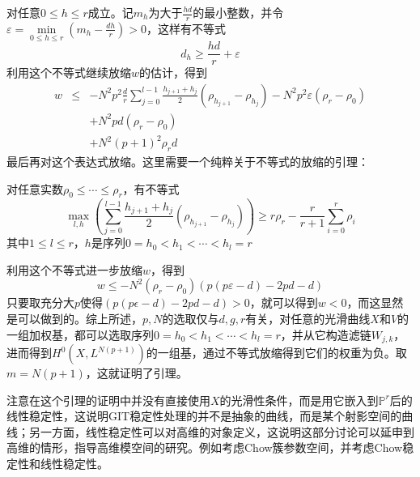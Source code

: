 对任意$ 0\leqslant h \leqslant r $成立。记$ m_h $为大于$ \frac{hd}{r} $的最小整数，并令$ \varepsilon=\underset{0\leqslant h \leqslant r}{\min}(m_h-\frac{dh}{r})>0 $，这样有不等式
$$ d_h\geqslant \dfrac{hd}{r}+\varepsilon $$
利用这个不等式继续放缩$ w $的估计，得到
\begin{equation*}
\begin{array}{rcl}
w&\leqslant&-N^2p^2\frac{d}{r}\sum_{j=0}^{l-1}\frac{    {h_{j+1}+ {h_j} }  }{2}(\rho_{h_{j+1}}-\rho_{h_j})-N^2p^2\varepsilon(\rho_r-\rho_0)\\
&&+N^2pd(\rho_r-\rho_0)\\
&&+N^2(p+1)^2\rho_rd
\end{array}
\end{equation*}
最后再对这个表达式放缩。这里需要一个纯粹关于不等式的放缩的引理：
\begin{lemma}[\cite{GeometryAlgCurvesII}\uppercase\expandafter{\romannumeral14}.Lemma3.7]
	对任意实数$ \rho_0\leqslant\cdots \leqslant \rho_r $，有不等式
	$$ \underset{l,h}{\max}\left(  \sum_{j=0}^{l-1}\frac{    {h_{j+1}+ {h_j} }  }{2}(\rho_{h_{j+1}}-\rho_{h_j})  \right)\geqslant r\rho_r-\frac{r}{r+1}\sum_{i=0}^{r}\rho_i  $$
	其中$ 1\leqslant l \leqslant r $，$ h $是序列$ 0=h_0<h_1<\cdots <h_l=r $
\end{lemma}
利用这个不等式进一步放缩$ w $，得到
$$ w\leqslant -N^2(\rho_r-\rho_0)( p(p\varepsilon-d)-2pd-d  ) $$
只要取充分大$ p $使得$ ( p(p\epsilon-d)-2pd-d  ) >0$，就可以得到$ w<0 $，而这显然是可以做到的。综上所述，$ p,N $的选取仅与$ d,g,r $有关，对任意的光滑曲线$ X $和$ V $的一组加权基，都可以选取序列$ 0=h_0<h_1<\cdots <h_l=r $，并从它构造滤链$ W_{j,k} $，进而得到$ H^0(X,L^{N(p+1)}) $的一组基，通过不等式放缩得到它们的权重为负。取$ m=N(p+1) $，这就证明了引理。

注意在这个引理的证明中并没有直接使用$ X $的光滑性条件，而是用它嵌入到$ \mathbb{P}^r $后的线性稳定性，这说明GIT稳定性处理的并不是抽象的曲线，而是某个射影空间的曲线；另一方面，线性稳定性可以对高维的对象定义，这说明这部分讨论可以延申到高维的情形，指导高维模空间的研究。例如考虑Chow簇参数空间，并考虑Chow稳定性和线性稳定性。

